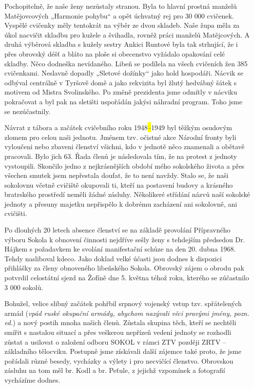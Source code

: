 Pochopitelně, že naše ženy nezůstaly stranou. Byla to hlavní prostná
manželů Matějovcových „Harmonie pohybu`` a opět úchvatný rej pro 30 000
cvičenek. Vyspělé cvičenky měly tentokrát na výběr ze dvou skladeb. Naše
župa měla za úkol nacvičit skladbu pro kužele a švihadla, rovněž práci
manželů Matějcových. A druhá výběrová skladba s kužely sestry Ankici
Runtové byla tak strhující, že i přes obrovský déšť a bláto na ploše si
obecenstvo vyžádalo opakování celé skladby. Něco dodneška nevídaného.
Libeň se podílela na všech cvičeních žen 385 cvičenkami. Neslavně
dopadly „Sletové dožínky`` jako hold hospodáři. Nácvik se odbýval
centrálně v Tyršově domě a jako rekvizita byl žlutý hedvábný šátek s
motivem od Mistra Svolinského. Po změně prezidenta jsme odmítly v
nácviku pokračovat a byl pak na sletišti uspořádán jakýsi náhradní
program. Toho jsme se nezúčastnily.

Návrat z tábora a začátek cvičebního roku 1948\emph{\hl{--}}1949 byl
těžkým osudovým zlomem pro celou naši jednotu. Jménem tzv. očistné akce
Národní fronty byli vyloučeni nebo zbaveni členství všichni, kdo v
jednotě něco znamenali a obětavě pracovali. Bylo jich 63. Řada členů je
následovala tím, že na protest z jednoty vystoupili. Skončilo jedno z
nejkrásnějších období mého sokolského života a přes všechen smutek jsem
nepřestala doufat, že to není navždy. Stalo se, že naši sokolovnu včetně
cvičiště okupovali ti, kteří na postavení budovy a krásného bratrského
prostředí neměli žádné zásluhy. Několikeré střídání názvů naší sokolské
jednoty a přesuny majetku nepřispělo k dobrému zacházení ani sokolovně,
ani cvičišti.

Po dlouhých 20 letech absence členství se na základě provolání
Přípravného výboru Sokola k obnovení činnosti nejdříve sešly ženy s
tehdejším předsedou Dr. Hájkem s požadavkem ke svolání manifestační
schůze na den 20. dubna 1968. Tehdy nasliboval kdeco. Jako doklad velké
účasti jsou dodnes k dispozici přihlášky za členy obnoveného libeňského
Sokola. Obrovský zájem o obrodu pak potvrdil celostátní sjezd na Žofíně
dne 5. května téhož roku, kterého se zúčastnilo 3 000 sokolů.

Bohužel, velice slibný začátek pohřbil srpnový vojenský vstup tzv.
spřátelených armád (\emph{vpád ruské okupační armády, abychom nazývali
věci pravými jmény, pozn. ed.}) a nový postih mnoha našich členů.
Zůstala skupina těch, kteří se nechtěli smířit s nastalou situací a přes
veškerou nepřízeň vedení jednoty se rozhodli zůstat a usilovat o
založení odboru SOKOL v rámci ZTV později ZRTV -- základního tělocviku.
Postupně jsme získávali další zájemce také proto, že jsme pořádali různé
besedy, vycházky a výlety i pro necvičící členstvo. Obrovskou zásluhu na
tom měl br. Kodl a br. Peťule, z jejichž vzpomínek a fotografií
vycházíme dodnes.

